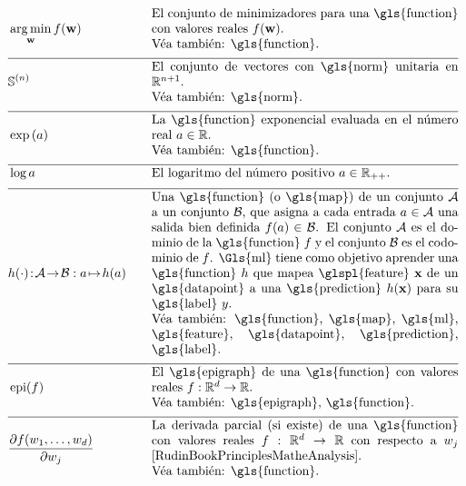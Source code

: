 \newpage
\begin{align}
    	&\aargmin_{\weights} f(\weights) &\quad &\parbox{.70\textwidth}{El conjunto de minimizadores para una \gls{function} con valores reales $f(\weights)$. 
    		\\ Véa también: \gls{function}.} \nonumber \\[2mm] \hline \nonumber\\[-5mm]
    	&\sphere{\nrnodes} &\quad &\parbox{.70\textwidth}{El conjunto de vectores con \gls{norm} unitaria en $\mathbb{R}^{\nrnodes+1}$.
    		\\ Véa también: \gls{norm}.} \nonumber \\[2mm] \hline \nonumber\\[-5mm]
	&\exp\,(a) &\quad &\parbox{.70\textwidth}{La \gls{function} exponencial evaluada en el número real $a \in \mathbb{R}$.
		\\ Véa también: \gls{function}.} \nonumber \\[2mm] \hline \nonumber\\[-5mm]
	&\log a &\quad &\mbox{El logaritmo del número positivo $a \in \mathbb{R}_{++}$.} \nonumber \\[2mm] \hline \nonumber\\[-5mm]
	&\hypothesis(\cdot)\!:\!\mathcal{A}\!\rightarrow\!\mathcal{B} :  a \!\mapsto\!h(a) &\quad &\parbox{.70\textwidth}{
	 	Una \gls{function} (o \gls{map}) de un conjunto $\mathcal{A}$ a un conjunto $\mathcal{B}$, que asigna a cada entrada 
	 	$a \in \mathcal{A}$ una salida bien definida $f(a) \in \mathcal{B}$.
	 	El conjunto $\mathcal{A}$ es el dominio de la \gls{function} $f$ y el conjunto $\mathcal{B}$ es el 
	 	codominio de $f$. \Gls{ml} tiene como objetivo aprender una \gls{function} $\hypothesis$ que mapea \glspl{feature} 
	 	$\featurevec$ de un \gls{datapoint} a una \gls{prediction} $\hypothesis(\featurevec)$ para su \gls{label} $\truelabel$.
		\\ Véa también: \gls{function}, \gls{map}, \gls{ml}, \gls{feature}, \gls{datapoint}, \gls{prediction}, \gls{label}.} \nonumber \\[2mm] \hline \nonumber\\[-5mm]
	&\operatorname{epi}(f)  & \quad & \parbox{.70\textwidth}{El \gls{epigraph} de una \gls{function} con valores reales 
	 	$f: \mathbb{R}^{\featuredim}\rightarrow \mathbb{R}$.
		\\ Véa también: \gls{epigraph}, \gls{function}.} \nonumber \\[2mm]  \hline \nonumber\\[-5mm]
	&  \frac{\partial f(\weight_{1}, \ldots, \weight_{\nrfeatures})}{\partial \weight_{\featureidx}} & \quad & \parbox{.70\textwidth}{La derivada parcial (si existe) de 
	 	una \gls{function} con valores reales $f: \mathbb{R}^{\featuredim}\rightarrow \mathbb{R}$ con respecto a $\weight_{\featureidx}$ \cite[Ch. 9]{RudinBookPrinciplesMatheAnalysis}.
		\\ Véa también: \gls{function}.} \nonumber 
\end{align} 

